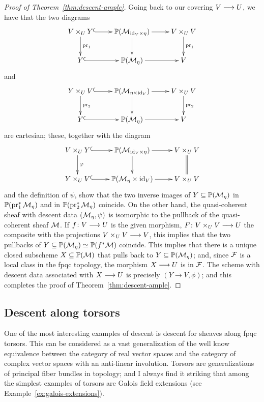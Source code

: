 \begin{4   STACKS}
\begin{4.3 Descent for morphisms of schemes}
\begin{proof}[Proof of Theorem~\ref{thm:descent-ample}]
Going back to our covering $V \arr U$, we have that the two diagrams
   \[
   \xymatrix{
   V\times_{U}Y\ar[d]^{\pr_{1}} \ar@{^(->}[r]
   & {}\PP(\cM_{\id_{V}\times \eta}) \ar[r]\ar[d]
   & V\times_{U}V \ar[d]^{\pr_{1}}
   \\
   Y \ar@{^(->}[r]
   & {}\PP(\cM_{\eta}) \ar[r]
   & V
   }
   \]
and
   \[
   \xymatrix{
   Y\times_{U}V\ar[d]^{\pr_{2}} \ar@{^(->}[r]
   & {}\PP(\cM_{\eta\times\id_{V}}) \ar[r]\ar[d]
   & V\times_{U}V \ar[d]^{\pr_{2}}
   \\
   Y \ar@{^(->}[r]
   & {}\PP(\cM_{\eta}) \ar[r]
   & V
   }
   \]
are cartesian; these, together with the diagram
   \[
   \xymatrix{
   V\times_{U}Y\ar[d]^{\phi} \ar@{^(->}[r]
   & {}\PP(\cM_{\id_{V}\times \eta}) \ar[r]\ar[d]
   & V\times_{U}V \ar@{=}[d]
   \\
   Y\times_{U} V \ar@{^(->}[r]
   & {}\PP(\cM_{\eta}\times\id_{V}) \ar[r]
   & V\times_{U}V
   }
   \]
and the definition of $\psi$, show that the two inverse images of $Y \subseteq \mathbb{P}(\mathcal{M}_{\eta})$ in $\mathbb{P}(\operatorname{pr}_{1}^{*}\mathcal{M}_{\eta})$ and in $\mathbb{P}(\operatorname{pr}_{2}^{*}\mathcal{M}_{\eta})$ coincide. On the other hand, the quasi-coherent sheaf with descent data $(\mathcal{M}_{\eta},\psi)$ is isomorphic to the pullback of the quasi-coherent sheaf $\mathcal{M}$. If $f\colon V \arr U$ is the given morphism, $F\colon V \times_{U} V \arr U$ the composite with the projections $V\times_{U}V \arr V$, this implies that the two pullbacks of $Y \subseteq \mathbb{P}(\mathcal{M}_{\eta}) \simeq \mathbb{P}(f^{*}\mathcal{M})$ coincide. This implies that there is a unique closed subscheme $X \subseteq \mathbb{P}(\mathcal{M})$ that pulls back to $Y \subseteq \mathbb{P}(\mathcal{M}_{\eta})$; and, since $\mathcal{F}$ is a local class in the fpqc topology, the morphism $X \arr U$ is in $\mathcal{F}$. The scheme with descent data associated with $X \arr U$ is precisely $(Y \to V, \phi)$; and this completes the proof of Theorem~\ref{thm:descent-ample}.
\end{proof}



\end{4.3 Descent for morphisms of schemes}
\begin{4.4 Descent along torsors}
\setcounter{section}{3}
\section{Descent along torsors}

One of the most interesting examples of descent is descent for \qc sheaves along fpqc torsors. This can be considered as a vast generalization of the well know equivalence between the category of real vector spaces and the category of complex vector spaces with an anti-linear involution. Torsors are generalizations of principal fiber bundles in topology; and I always find it striking that among the simplest examples of torsors are Galois field extensions (see Example~\ref{ex:galois-extensions}).


\end{4.4 Descent along torsors}
\end{4   STACKS}
